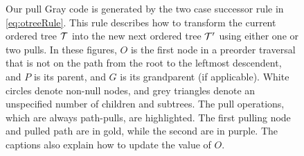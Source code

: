 \begin{figure}[H]
    \caption{Our pull Gray code is generated by the two case successor rule in \eqref{eq:otreeRule}.
    This rule describes how to transform the current ordered tree $\mathcal{T}$ into the new next ordered tree $\mathcal{T'}$ using either one or two pulls.
    In these figures, ${O}$ is the first node in a preorder traversal that is not on the path from the root to the leftmost descendent, and ${P}$ is its parent, and ${G}$ is its grandparent (if applicable).
    White circles denote non-null nodes, and grey triangles denote an unspecified number of children and subtrees.
    The pull operations, which are always path-pulls, are highlighted.
    The first pulling node and pulled path are in gold, while the second are in purple.
    The captions also explain how to update the value of ${O}$.}
    \label{fig:next}
\end{figure}

